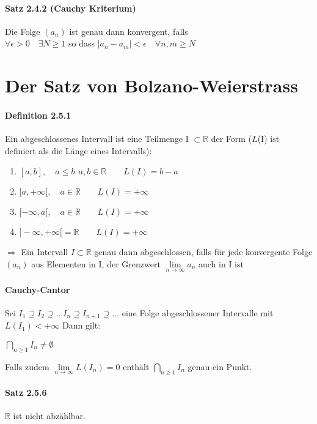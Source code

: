 \documentclass[8pt]{extreport}
\begin{document}
\paragraph{Satz 2.4.2 (Cauchy Kriterium)} Die Folge $(a_{n})$ ist genau dann konvergent, falls\\
$\forall \epsilon > 0 \quad \exists N \geq 1$ so dass $|a_{n} - a_{m}| < \epsilon \quad \forall n,m \geq N$
\section{Der Satz von Bolzano-Weierstrass}
\paragraph{Definition 2.5.1} Ein abgeschlossenes Intervall ist eine Teilmenge I $\subset \mathbb{R}$ der Form ($\mathit{L}$(I) ist definiert als die Länge eines Intervalls):
\begin{enumerate}
\item $[a,b], \quad a\leq b \ \ a,b \in \mathbb{R} \qquad \mathit{L}(I) = b-a$
\item $[a,+\infty[, \quad a \in \mathbb{R}  \qquad \mathit{L}(I) = + \infty$
\item $[-\infty,a[, \quad a \in \mathbb{R}  \qquad \mathit{L}(I) = + \infty$
\item $]-\infty,+\infty[ = \mathbb{R} \qquad \mathit{L}(I) = +\infty$
\end{enumerate}
$ \Rightarrow$ Ein Intervall $I \subset \mathbb{R}$ genau dann abgeschlossen, falls für jede konvergente Folge $(a_{n})$ aus Elementen in I, der Grenzwert $\lim\limits_{n\to \infty}a_{n}$ auch in I ist
\paragraph{Cauchy-Cantor} Sei $I_{1} \supseteq I_{2} \supseteq \dots I_{n} \supseteq I_{n+1} \supseteq \dots$ eine Folge abgeschlossener Intervalle mit $\mathit{L}(I_{1}) < +\infty$ Dann gilt:\\
\begin{center}
$\bigcap\limits_{n\geq 1} I_{n} \neq \emptyset$
\end{center}
Falls zudem $\lim\limits_{n\to \infty} \mathit{L}(I_{n}) = 0$ enthält $\bigcap\limits_{n\geq 1} I_{n}$ genau ein Punkt.
\paragraph{Satz 2.5.6} $\mathbb{R}$ ist nicht abzählbar.
\end{document}

